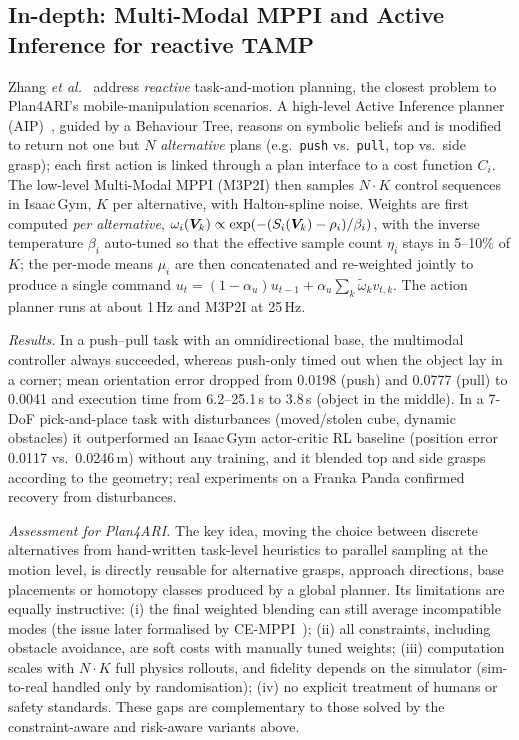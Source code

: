 \subsection{In-depth: Multi-Modal MPPI and Active Inference for reactive TAMP}
Zhang \emph{et al.}~\cite{zhang2024m3p2i} address \emph{reactive} task-and-motion planning, the closest problem to Plan4ARI's mobile-manipulation scenarios. A high-level Active Inference planner (AIP)~\cite{pezzato2023aip}, guided by a Behaviour Tree, reasons on symbolic beliefs and is modified to return not one but $N$ \emph{alternative} plans (e.g.\ \texttt{push} vs.\ \texttt{pull}, top vs.\ side grasp); each first action is linked through a plan interface to a cost function $C_i$. The low-level Multi-Modal MPPI (M3P2I) then samples $N\!\cdot\!K$ control sequences in Isaac\,Gym, $K$ per alternative, with Halton-spline noise. Weights are first computed \emph{per alternative}, $\omega_i(\bm{V}_k)\propto\exp(-(S_i(\bm{V}_k)-\rho_i)/\beta_i)$, with the inverse temperature $\beta_i$ auto-tuned so that the effective sample count $\eta_i$ stays in 5--10\% of $K$; the per-mode means $\mu_i$ are then concatenated and re-weighted jointly to produce a single command $u_t=(1-\alpha_u)u_{t-1}+\alpha_u\sum_k\tilde\omega_k v_{t,k}$. The action planner runs at about 1\,Hz and M3P2I at 25\,Hz.

\emph{Results.} In a push--pull task with an omnidirectional base, the multimodal controller always succeeded, whereas push-only timed out when the object lay in a corner; mean orientation error dropped from 0.0198 (push) and 0.0777 (pull) to 0.0041 and execution time from 6.2--25.1\,s to 3.8\,s (object in the middle). In a 7-DoF pick-and-place task with disturbances (moved/stolen cube, dynamic obstacles) it outperformed an Isaac\,Gym actor-critic RL baseline (position error 0.0117 vs.\ 0.0246\,m) without any training, and it blended top and side grasps according to the geometry; real experiments on a Franka Panda confirmed recovery from disturbances.

\emph{Assessment for Plan4ARI.} The key idea, moving the choice between discrete alternatives from hand-written task-level heuristics to parallel sampling at the motion level, is directly reusable for alternative grasps, approach directions, base placements or homotopy classes produced by a global planner. Its limitations are equally instructive: (i) the final weighted blending can still average incompatible modes (the issue later formalised by CE-MPPI~\cite{liu2026clusteringmppi}); (ii) all constraints, including obstacle avoidance, are soft costs with manually tuned weights; (iii) computation scales with $N\!\cdot\!K$ full physics rollouts, and fidelity depends on the simulator (sim-to-real handled only by randomisation); (iv) no explicit treatment of humans or safety standards. These gaps are complementary to those solved by the constraint-aware and risk-aware variants above.

